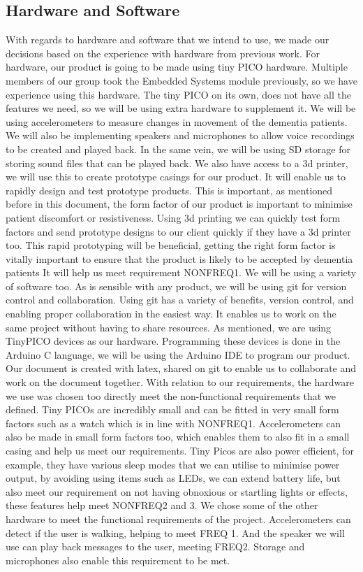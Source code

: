     \subsection{Hardware and Software}
    With regards to hardware and software that we intend to use, we made our decisions based on the experience with hardware from previous work. For hardware, our product is going to be made using tiny PICO hardware. Multiple members of our group took the Embedded Systems module previously, so we have experience using this hardware. The tiny PICO on its own, does not have all the features we need, so we will be using extra hardware to supplement it. We will be using accelerometers to measure changes in movement of the dementia patients. We will also be implementing speakers and microphones to allow voice recordings to be created and played back. In the same vein, we will be using SD storage for storing sound files that can be played back. We also have access to a 3d printer, we will use this to create prototype casings for our product. It will enable us to rapidly design and test prototype products. This is important, as mentioned before in this document, the form factor of our product is important to minimise patient discomfort or resistiveness. Using 3d printing we can quickly test form factors and send prototype designs to our client quickly if they have a 3d printer too. This rapid prototyping will be beneficial, getting the right form factor is vitally important to ensure that the product is likely to be accepted by dementia patients It will help us meet requirement NONFREQ1. 
We will be using a variety of software too. As is sensible with any product, we will be using git for version control and collaboration. Using git has a variety of benefits, version control, and enabling proper collaboration in the easiest way. It enables us to work on the same project without having to share resources. As mentioned, we are using TinyPICO devices as our hardware. Programming these devices is done in the Arduino C language, we will be using the Arduino IDE to program our product. Our document is created with latex, shared on git to enable us to collaborate and work on the document together. 
With relation to our requirements, the hardware we use was chosen too directly meet the non-functional requirements that we defined. Tiny PICOs are incredibly small and can be fitted in very small form factors such as a watch which is in line with NONFREQ1. Accelerometers can also be made in small form factors too, which enables them to also fit in a small casing and help us meet our requirements. Tiny Picos are also power efficient, for example, they have various sleep modes that we can utilise to minimise power output, by avoiding using items such as LEDs, we can extend battery life, but also meet our requirement on not having obnoxious or startling lights or effects, these features help meet NONFREQ2 and 3. We chose some of the other hardware to meet the functional requirements of the project. Accelerometers can detect if the user is walking, helping to meet FREQ 1. And the speaker we will use can play back messages to the user, meeting FREQ2. Storage and microphones also enable this requirement to be met.

    
